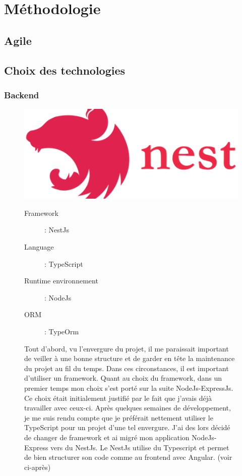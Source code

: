 \section{Méthodologie}
\subsection{Agile}


\subsection{Choix des technologies}
\subsubsection{Backend}
\begin{figure}[H]
  \begin{minipage}{.3\textwidth}
    \includegraphics[width=0.75\linewidth]{img/tech/NestJs.png} 
  \end{minipage}
  \begin{minipage}{.7\textwidth}
    \begin{description}
      \item[Framework]: NestJs
      \item[Language]: TypeScript
      \item[Runtime environnement]: NodeJs  
      \item[ORM]: TypeOrm 
    \end{description}
    Tout d'abord, vu l'envergure du projet, il me paraissait important de veiller à une bonne structure et de garder en tête la maintenance du projet au fil du temps. Dans ces circonstances, il est important d'utiliser un framework. Quant au choix du framework, dans un premier temps mon choix s'est porté sur la suite NodeJs-ExpressJs. Ce choix était initialement justifié par le fait que j'avais déjà travailler avec ceux-ci. Après quelques semaines de développement, je me suis rendu compte que je préférait nettement utiliser le TypeScript pour un projet d'une tel envergure. J'ai des lors décidé de changer de framework et ai migré mon application NodeJs-Express vers du NestJs. Le NestJs utilise du Typescript et permet de bien structurer son code comme au frontend avec Angular. (voir ci-après)
  \end{minipage}
\end{figure}

